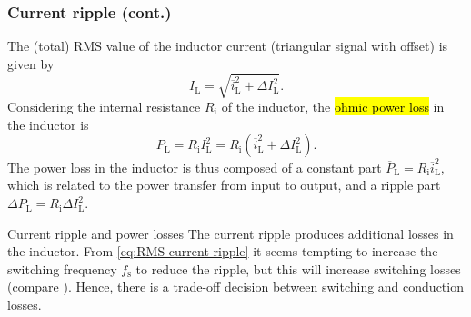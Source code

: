 \begin{frame}
    \frametitle{Current ripple (cont.)}
    The (total) RMS value of the inductor current (triangular signal with offset) is given by
    \begin{equation}
        I_\mathrm{L} = \sqrt{\overline{i}^2_\mathrm{L} + \Delta I^2_\mathrm{L}}.
    \end{equation}
    \pause
    Considering the internal resistance $R_\mathrm{i}$ of the inductor, the \hl{ohmic power loss} in the inductor is
    \begin{equation}
        P_\mathrm{L} = R_\mathrm{i} I^2_\mathrm{L} = R_\mathrm{i} \left(\overline{i}^2_\mathrm{L} + \Delta I^2_\mathrm{L}\right).
        \label{eq:power-loss-ripple-inductor-step-down-converter}
    \end{equation}
    \pause
    The power loss in the inductor is thus composed of a constant part $\overline{P}_\mathrm{L} = R_\mathrm{i} \overline{i}^2_\mathrm{L}$, which is related to the power transfer from input to output, and a ripple part $\Delta P_\mathrm{L} = R_\mathrm{i} \Delta I^2_\mathrm{L}$.   
    \pause%
    \begin{varblock}{Current ripple and power losses}
        The current ripple produces additional losses in the inductor. From \eqref{eq:RMS-current-ripple} it seems tempting to increase the switching frequency $f_\mathrm{s}$ to reduce the ripple, but this will increase switching losses (compare ). Hence, there is a trade-off decision between switching and conduction losses.
    \end{varblock}
\end{frame}

